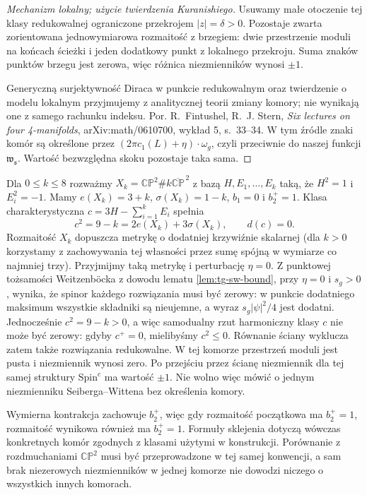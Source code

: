 \begin{proof}[Mechanizm lokalny; użycie twierdzenia Kuranishiego]
Usuwamy małe otoczenie tej klasy redukowalnej
ograniczone przekrojem $|z|=\delta>0$.
Pozostaje zwarta zorientowana jednowymiarowa
rozmaitość z brzegiem: dwie przestrzenie
moduli na końcach ścieżki i jeden dodatkowy
punkt z lokalnego przekroju.
Suma znaków punktów brzegu jest zerowa,
więc różnica niezmienników wynosi $\pm1$.

Generyczną surjektywność Diraca w punkcie
redukowalnym oraz twierdzenie o modelu
lokalnym przyjmujemy z analitycznej teorii
zmiany komory; nie wynikają one z samego
rachunku indeksu. Por. R.~Fintushel,
R.~J. Stern, \emph{Six lectures on four 4-manifolds},
arXiv:math/0610700, wykład 5, s.~33--34.
W tym źródle znaki komór są określone przez
$(2\pi c_1(L)+\eta)\cdot\omega_g$, czyli
przeciwnie do naszej funkcji $\mathfrak w_{\mathfrak s}$.
Wartość bezwzględna skoku pozostaje taka sama.
\end{proof}

\begin{przyklad}
Dla $0\leq k\leq8$ rozważmy
$X_k=\mathbb{CP}^2\#k\overline{\mathbb{CP}}^{\,2}$
z bazą $H,E_1,\ldots,E_k$ taką, że $H^2=1$ i $E_i^2=-1$.
Mamy $e(X_k)=3+k$, $\sigma(X_k)=1-k$, $b_1=0$ i $b_2^+=1$.
Klasa charakterystyczna $c=3H-\sum_{i=1}^kE_i$ spełnia
\[
c^2=9-k=2e(X_k)+3\sigma(X_k),\qquad d(c)=0.
\]
Rozmaitość $X_k$ dopuszcza metrykę o dodatniej krzywiźnie
skalarnej (dla $k>0$ korzystamy z zachowywania tej własności
przez sumę spójną w wymiarze co najmniej trzy).
Przyjmijmy taką metrykę i perturbację $\eta=0$.
Z punktowej tożsamości Weitzenböcka z dowodu
lematu \ref{lem:tg-sw-bound}, przy $\eta=0$
i $s_g>0$, wynika, że spinor każdego rozwiązania
musi być zerowy: w punkcie dodatniego maksimum
wszystkie składniki są nieujemne, a wyraz
$s_g|\psi|^2/4$ jest dodatni. Jednocześnie $c^2=9-k>0$,
a więc samodualny rzut harmoniczny klasy $c$ nie może
być zerowy: gdyby $c^+=0$, mielibyśmy $c^2\leq0$.
Równanie ściany wyklucza zatem także rozwiązania
redukowalne. W tej komorze przestrzeń moduli jest pusta
i niezmiennik wynosi zero. Po przejściu przez ścianę
niezmiennik dla tej samej struktury $\mathrm{Spin}^c$
ma wartość $\pm1$. Nie wolno więc mówić o jednym
niezmienniku Seiberga--Wittena bez określenia komory.
\end{przyklad}

\begin{uwaga}
Wymierna kontrakcja zachowuje $b_2^+$, więc gdy rozmaitość
początkowa ma $b_2^+=1$, rozmaitość wynikowa również ma
$b_2^+=1$. Formuły sklejenia dotyczą wówczas konkretnych
komór zgodnych z klasami użytymi w konstrukcji.
Porównanie z rozdmuchaniami $\mathbb{CP}^2$ musi być
przeprowadzone w tej samej konwencji, a sam brak niezerowych
niezmienników w jednej komorze nie dowodzi niczego
o wszystkich innych komorach.
\end{uwaga}

